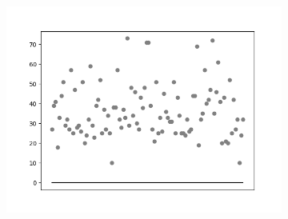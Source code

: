 \begin{figure}[hb!]
\begin{subfigure}[hb]{0.5\linewidth}
		 \includegraphics[width=\linewidth]{img/graficos/reta0/lenet/fig-reta-0-image-treat-2-lenet-lrelu.png}
		\end{subfigure}%
	\end{figure}


